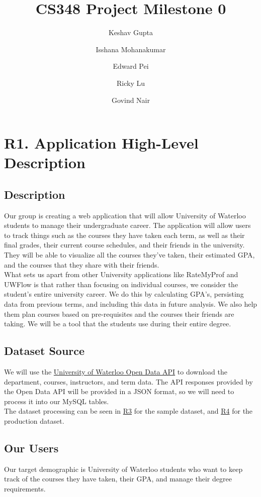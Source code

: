 \documentclass[12pt, a4paper]{article}
\title{CS348 Project Milestone 0}
\author{Keshav Gupta\and Isshana Mohanakumar \and Edward Pei \and Ricky Lu \and Govind Nair}
\begin{document}
\maketitle

\section*{R1. Application High-Level Description}
\label{sec:R1}
\subsection*{Description}
Our group is creating a web application that will allow University of Waterloo students to manage their undergraduate career. The application will allow users to track things such as the courses they have taken each term, as well as their final grades, their current course schedules, and their friends in the university. They will be able to visualize all the courses they've taken, their estimated GPA, and the courses that they share with their friends.\\

What sets us apart from other University applications like RateMyProf and UWFlow is that rather than focusing on individual courses, we consider the student's entire university career. We do this by calculating GPA's, persisting data from previous terms, and including this data in future analysis. We also help them plan courses based on pre-requisites and the courses their friends are taking. We will be a tool that the students use during their entire degree.

\subsection*{Dataset Source}
We will use the \href{https://openapi.data.uwaterloo.ca/api-docs/index.html}{University of Waterloo Open Data API} to download the department, courses, instructors, and term data. The API responses provided by the Open Data API will be provided in a JSON format, so we will need to process it into our MySQL tables.\\

The dataset processing can be seen in \hyperref[sec:R3]{R3} for the sample dataset, and \hyperref[sec:R4]{R4} for the production dataset.

\subsection*{Our Users}
Our target demographic is University of Waterloo students who want to keep track of the courses they have taken, their GPA, and manage their degree requirements.\\
\end{document}
